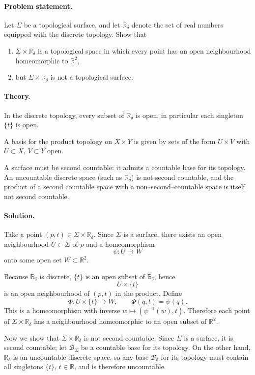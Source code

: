 \documentclass[12pt,a4paper]{article}
\theoremstyle{plain}
\theoremstyle{definition}      %
\begin{document}
\paragraph{Problem statement.}
Let $\Sigma$ be a topological surface, and let $\mathbb{R}_\delta$ denote
the set of real numbers equipped with the discrete topology.
Show that
\begin{enumerate}
	\item $\Sigma\times\mathbb{R}_\delta$ is a topological space in which
	every point has an open neighbourhood homeomorphic to $\mathbb{R}^2$,
	\item but $\Sigma\times\mathbb{R}_\delta$ is not a topological surface.
\end{enumerate}

\paragraph{Theory.}
In the discrete topology, every subset of $\mathbb{R}_\delta$ is open,
in particular each singleton $\{t\}$ is open.

A basis for the product topology on $X\times Y$ is given by sets of the
form $U\times V$ with $U\subset X$, $V\subset Y$ open.

A surface must be second countable: it admits a countable base for its
topology.  An uncountable discrete space (such as $\mathbb{R}_\delta$)
is not second countable, and the product of a second countable space
with a non--second--countable space is itself not second countable.

\paragraph{Solution.}
Take a point $(p,t)\in\Sigma\times\mathbb{R}_\delta$.
Since $\Sigma$ is a surface, there exists an open neighbourhood
$U\subset\Sigma$ of $p$ and a homeomorphism
\[
\psi:U\to W
\]
onto some open set $W\subset\mathbb{R}^2$.

Because $\mathbb{R}_\delta$ is discrete, $\{t\}$ is an open subset of
$\mathbb{R}_\delta$, hence
\[
U\times\{t\}
\]
is an open neighbourhood of $(p,t)$ in the product.
Define
\[
\Phi:U\times\{t\}\to W,\qquad \Phi(q,t)=\psi(q).
\]
This is a homeomorphism with inverse $w\mapsto(\psi^{-1}(w),t)$.
Therefore each point of $\Sigma\times\mathbb{R}_\delta$ has a
neighbourhood homeomorphic to an open subset of $\mathbb{R}^2$.

Now we show that $\Sigma\times\mathbb{R}_\delta$ is not second countable.
Since $\Sigma$ is a surface, it is second countable; let
$\mathcal{B}_\Sigma$ be a countable base for its topology.
On the other hand, $\mathbb{R}_\delta$ is an uncountable discrete space,
so any base $\mathcal{B}_\delta$ for its topology must contain all
singletons $\{t\}$, $t\in\mathbb{R}$, and is therefore uncountable.
\end{document}
